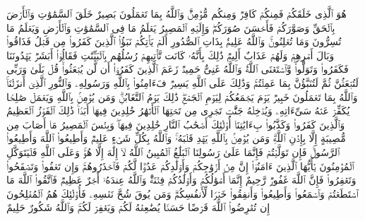\startbuffer[\q:64:2]
هُوَ ٱلَّذِی خَلَقَكُمۡ فَمِنكُمۡ كَافِرࣱ وَمِنكُم مُّؤۡمِنࣱۚ وَٱللَّهُ بِمَا تَعۡمَلُونَ بَصِیرٌ%
\stopbuffer
\startbuffer[\q:64:3]
خَلَقَ ٱلسَّمَٰوَٰتِ وَٱلۡأَرۡضَ بِٱلۡحَقِّ وَصَوَّرَكُمۡ فَأَحۡسَنَ صُوَرَكُمۡۖ وَإِلَیۡهِ ٱلۡمَصِیرُ%
\stopbuffer
\startbuffer[\q:64:4]
یَعۡلَمُ مَا فِی ٱلسَّمَٰوَٰتِ وَٱلۡأَرۡضِ وَیَعۡلَمُ مَا تُسِرُّونَ وَمَا تُعۡلِنُونَۚ وَٱللَّهُ عَلِیمُۢ بِذَاتِ ٱلصُّدُورِ%
\stopbuffer
\startbuffer[\q:64:5]
أَلَمۡ یَأۡتِكُمۡ نَبَؤُا۟ ٱلَّذِینَ كَفَرُوا۟ مِن قَبۡلُ فَذَاقُوا۟ وَبَالَ أَمۡرِهِمۡ وَلَهُمۡ عَذَابٌ أَلِیمࣱ%
\stopbuffer
\startbuffer[\q:64:6]
ذَٰلِكَ بِأَنَّهُۥ كَانَت تَّأۡتِیهِمۡ رُسُلُهُم بِٱلۡبَیِّنَٰتِ فَقَالُوۤا۟ أَبَشَرࣱ یَهۡدُونَنَا فَكَفَرُوا۟ وَتَوَلَّوا۟ۖ وَّٱسۡتَغۡنَى ٱللَّهُۚ وَٱللَّهُ غَنِیٌّ حَمِیدࣱ%
\stopbuffer
\startbuffer[\q:64:7]
زَعَمَ ٱلَّذِینَ كَفَرُوۤا۟ أَن لَّن یُبۡعَثُوا۟ۚ قُلۡ بَلَىٰ وَرَبِّی لَتُبۡعَثُنَّ ثُمَّ لَتُنَبَّؤُنَّ بِمَا عَمِلۡتُمۡۚ وَذَٰلِكَ عَلَى ٱللَّهِ یَسِیرࣱ%
\stopbuffer
\startbuffer[\q:64:8]
فَءَامِنُوا۟ بِٱللَّهِ وَرَسُولِهِۦ وَٱلنُّورِ ٱلَّذِیۤ أَنزَلۡنَاۚ وَٱللَّهُ بِمَا تَعۡمَلُونَ خَبِیرࣱ%
\stopbuffer
\startbuffer[\q:64:9]
یَوۡمَ یَجۡمَعُكُمۡ لِیَوۡمِ ٱلۡجَمۡعِۖ ذَٰلِكَ یَوۡمُ ٱلتَّغَابُنِۗ وَمَن یُؤۡمِنۢ بِٱللَّهِ وَیَعۡمَلۡ صَٰلِحࣰا یُكَفِّرۡ عَنۡهُ سَیِّءَاتِهِۦ وَیُدۡخِلۡهُ جَنَّٰتࣲ تَجۡرِی مِن تَحۡتِهَا ٱلۡأَنۡهَٰرُ خَٰلِدِینَ فِیهَاۤ أَبَدࣰاۚ ذَٰلِكَ ٱلۡفَوۡزُ ٱلۡعَظِیمُ%
\stopbuffer
\startbuffer[\q:64:10]
وَٱلَّذِینَ كَفَرُوا۟ وَكَذَّبُوا۟ بِءَایَٰتِنَاۤ أُو۟لَٰۤئِكَ أَصۡحَٰبُ ٱلنَّارِ خَٰلِدِینَ فِیهَاۖ وَبِئۡسَ ٱلۡمَصِیرُ%
\stopbuffer
\startbuffer[\q:64:11]
مَاۤ أَصَابَ مِن مُّصِیبَةٍ إِلَّا بِإِذۡنِ ٱللَّهِۗ وَمَن یُؤۡمِنۢ بِٱللَّهِ یَهۡدِ قَلۡبَهُۥۚ وَٱللَّهُ بِكُلِّ شَیۡءٍ عَلِیمࣱ%
\stopbuffer
\startbuffer[\q:64:12]
وَأَطِیعُوا۟ ٱللَّهَ وَأَطِیعُوا۟ ٱلرَّسُولَۚ فَإِن تَوَلَّیۡتُمۡ فَإِنَّمَا عَلَىٰ رَسُولِنَا ٱلۡبَلَٰغُ ٱلۡمُبِینُ%
\stopbuffer
\startbuffer[\q:64:13]
ٱللَّهُ لَاۤ إِلَٰهَ إِلَّا هُوَۚ وَعَلَى ٱللَّهِ فَلۡیَتَوَكَّلِ ٱلۡمُؤۡمِنُونَ%
\stopbuffer
\startbuffer[\q:64:14]
یَٰۤأَیُّهَا ٱلَّذِینَ ءَامَنُوۤا۟ إِنَّ مِنۡ أَزۡوَٰجِكُمۡ وَأَوۡلَٰدِكُمۡ عَدُوࣰّا لَّكُمۡ فَٱحۡذَرُوهُمۡۚ وَإِن تَعۡفُوا۟ وَتَصۡفَحُوا۟ وَتَغۡفِرُوا۟ فَإِنَّ ٱللَّهَ غَفُورࣱ رَّحِیمٌ%
\stopbuffer
\startbuffer[\q:64:15]
إِنَّمَاۤ أَمۡوَٰلُكُمۡ وَأَوۡلَٰدُكُمۡ فِتۡنَةࣱۚ وَٱللَّهُ عِندَهُۥۤ أَجۡرٌ عَظِیمࣱ%
\stopbuffer
\startbuffer[\q:64:16]
فَٱتَّقُوا۟ ٱللَّهَ مَا ٱسۡتَطَعۡتُمۡ وَٱسۡمَعُوا۟ وَأَطِیعُوا۟ وَأَنفِقُوا۟ خَیۡرࣰا لِّأَنفُسِكُمۡۗ وَمَن یُوقَ شُحَّ نَفۡسِهِۦ فَأُو۟لَٰۤئِكَ هُمُ ٱلۡمُفۡلِحُونَ%
\stopbuffer
\startbuffer[\q:64:17]
إِن تُقۡرِضُوا۟ ٱللَّهَ قَرۡضًا حَسَنࣰا یُضَٰعِفۡهُ لَكُمۡ وَیَغۡفِرۡ لَكُمۡۚ وَٱللَّهُ شَكُورٌ حَلِیمٌ%
